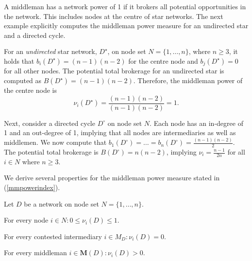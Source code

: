 \noindent
A middleman has a network power of 1 if it brokers all potential opportunities in the network. This includes nodes at the centre of star networks. The next example explicitly computes the middleman power measure for an undirected star and a directed cycle.

\begin{example} \label{starcycle}
For an \emph{undirected} star network, $D^{\star}$, on node set $N = \{ 1, \ldots ,n \}$, where $n \geqslant 3$, it holds that $b_{i}(D^{\star}) = (n-1)(n-2)$ for the centre node and $b_{j}(D^{\star})=0$ for all other nodes. The potential total brokerage for an undirected star is computed as $B(D^{\star}) = (n-1)(n-2)$. Therefore, the middleman power of the centre node is
\begin{equation}
\nu_{i}(D^{\star}) = \frac{(n-1)(n-2)}{(n-1)(n-2)} = 1 .
\end{equation}

\noindent Next, consider a directed cycle $D^{\circ}$ on node set $N$. Each node has an in-degree of 1 and an out-degree of 1, implying that all nodes are intermediaries as well as middlemen. We now compute that $b_{1}(D^{\circ}) = \ldots = b_{n}(D^{\circ}) = \frac{(n-1)(n-2)}{2}$. The potential total brokerage is $B (D^{\circ}) = n(n-2)$, implying $\nu_i = \frac{n-1}{2n}$ for all $i \in N$ where $n \geqslant 3$.
\end{example}

\noindent
We derive several properties for the middleman power measure stated in (\ref{mmpowerindex}).

\begin{theorem} \label{middlemanpowert}
Let $D$ be a network on node set $N=\{1, \ldots ,n\}$.
\begin{abet}
\item For every node $i \in N \colon 0 \leqslant \nu_{i} (D) \leqslant 1$.
\item For every contested intermediary $i \in M_D \colon \nu_{i}(D) = 0$.
\item For every middleman $i \in \mathbf M (D) \colon \nu_i (D) >0$.
\end{abet}
\end{theorem}

